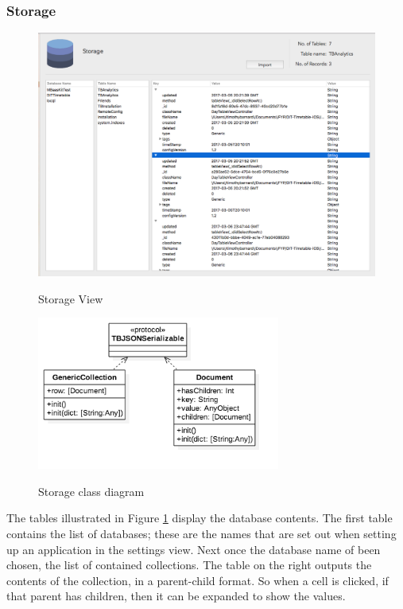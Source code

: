 \subsubsection{Storage}

\begin{figure}[!h]
    \caption{Storage View}
    \centering
    \includegraphics[width=120mm]{images/dashboard/storage}
    \label{fig:storage}
\end{figure}

\begin{figure}[!h]
    \caption{Storage class diagram}
    \centering
    \includegraphics[width=80mm]{images/classdiagrams/storage_class}
    \label{fig:storage_class}
\end{figure} 

The tables illustrated in Figure \ref{fig:storage} display the database contents. The first table contains the list of databases; these are the names that are set out when setting up an application in the settings view. Next once the database name of been chosen, the list of contained collections. The table on the right outputs the contents of the collection, in a parent-child format. So when a cell is clicked, if that parent has children, then it can be expanded to show the values.

